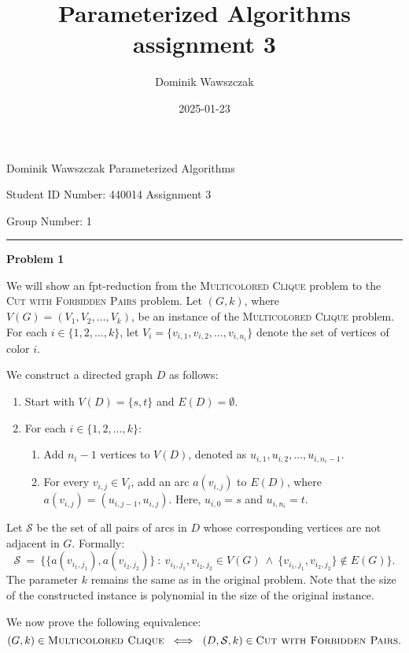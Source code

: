 \documentclass[12pt]{article}
\title{Parameterized Algorithms assignment 3}
\author{Dominik Wawszczak}
\date{2025-01-23}
\begin{document}
	\setlength{\parindent}{0 cm}
	
	Dominik Wawszczak \hfill Parameterized Algorithms
	
	Student ID Number: 440014 \hfill Assignment 3
	
	Group Number: 1
	
	\bigskip
	\hrule
	\bigskip
	
	\textbf{Problem 1}
	
	\medskip
	
	We will show an fpt-reduction from the \textsc{Multicolored Clique} problem
	to the \textsc{Cut with Forbidden Pairs} problem. Let \((G, k)\), where
	\(V(G) = (V_{1}, V_{2}, \ldots, V_{k})\), be an	instance of the
	\textsc{Multicolored Clique} problem. For each \(i \in \{1, 2, \ldots,
	k\}\), let \(V_{i} = \{v_{i, 1}, v_{i, 2}, \ldots, v_{i, n_{i}}\}\) denote
	the set of vertices of color \(i\).
	
	\medskip
	
	We construct a directed graph \(D\) as follows:
	\begin{enumerate}
		\item Start with \(V(D) = \{s, t\}\) and \(E(D) = \emptyset\).
		\item For each \(i \in \{1, 2, \ldots, k\}\):
		      \begin{enumerate}[label=\theenumi.\arabic*]
		          \item Add \(n_{i} - 1\) vertices to \(V(D)\), denoted as
		                \(u_{i, 1}, u_{i, 2}, \ldots, u_{i, n_{i} - 1}\).
		          \item For every \(v_{i, j} \in V_{i}\), add an arc
		                \(a(v_{i, j})\) to \(E(D)\), where \(a(v_{i, j}) =
		                (u_{i, j - 1}, u_{i, j})\). Here, \(u_{i, 0} = s\) and
		                \(u_{i, n_{i}} = t\).
		      \end{enumerate}
	\end{enumerate}
	Let \(\mathcal{S}\) be the set of all pairs of arcs in \(D\) whose
	corresponding vertices are not adjacent in \(G\). Formally:
	\[ \mathcal{S} \ = \ \{\{a(v_{i_{1}, j_{1}}), a(v_{i_{2}, j_{2}})\} \ : \
	v_{i_{1}, j_{1}}, v_{i_{2}, j_{2}} \in V(G) \ \wedge \ \{v_{i_{1}, j_{1}},
	v_{i_{2}, j_{2}}\} \notin E(G)\} \text{.} \]
	The parameter \(k\) remains the same as in the original problem. Note that
	the size of the constructed instance is polynomial in the size of the
	original instance.
	
	\medskip
	
	We now prove the following equivalence:
	\[ (G, k) \in \textsc{Multicolored Clique} \ \iff \ (D, \mathcal{S}, k) \in
	\textsc{Cut with Forbidden Pairs} \text{.} \]
	
\end{document}

